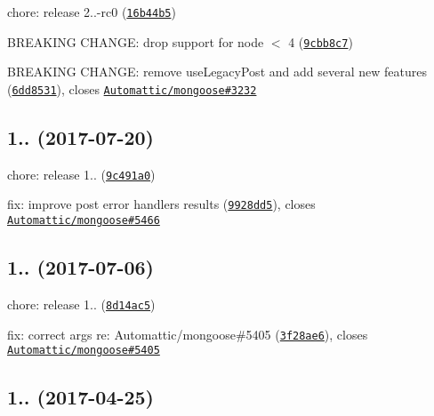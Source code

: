 \begin{DoxyItemize}
\item chore\+: release 2..-\/rc0 (\href{https://github.com/vkarpov15/kareem/commit/16b44b5}{\tt 16b44b5})
\item B\+R\+E\+A\+K\+I\+NG C\+H\+A\+N\+GE\+: drop support for node $<$ 4 (\href{https://github.com/vkarpov15/kareem/commit/9cbb8c7}{\tt 9cbb8c7})
\item B\+R\+E\+A\+K\+I\+NG C\+H\+A\+N\+GE\+: remove use\+Legacy\+Post and add several new features (\href{https://github.com/vkarpov15/kareem/commit/6dd8531}{\tt 6dd8531}), closes \href{https://github.com/Automattic/mongoose/issues/3232}{\tt Automattic/mongoose\#3232}
\end{DoxyItemize}

\label{_1.5.0}%
 \subsection*{1.. (2017-\/07-\/20)}


\begin{DoxyItemize}
\item chore\+: release 1.. (\href{https://github.com/vkarpov15/kareem/commit/9c491a0}{\tt 9c491a0})
\item fix\+: improve post error handlers results (\href{https://github.com/vkarpov15/kareem/commit/9928dd5}{\tt 9928dd5}), closes \href{https://github.com/Automattic/mongoose/issues/5466}{\tt Automattic/mongoose\#5466}
\end{DoxyItemize}

\label{_1.4.2}%
 \subsection*{
\footnotesize 1.. (2017-\/07-\/06)
\normalsize }


\begin{DoxyItemize}
\item chore\+: release 1.. (\href{https://github.com/vkarpov15/kareem/commit/8d14ac5}{\tt 8d14ac5})
\item fix\+: correct args re\+: Automattic/mongoose\#5405 (\href{https://github.com/vkarpov15/kareem/commit/3f28ae6}{\tt 3f28ae6}), closes \href{https://github.com/Automattic/mongoose/issues/5405}{\tt Automattic/mongoose\#5405}
\end{DoxyItemize}

\label{_1.4.1}%
 \subsection*{
\footnotesize 1.. (2017-\/04-\/25)
\normalsize }


